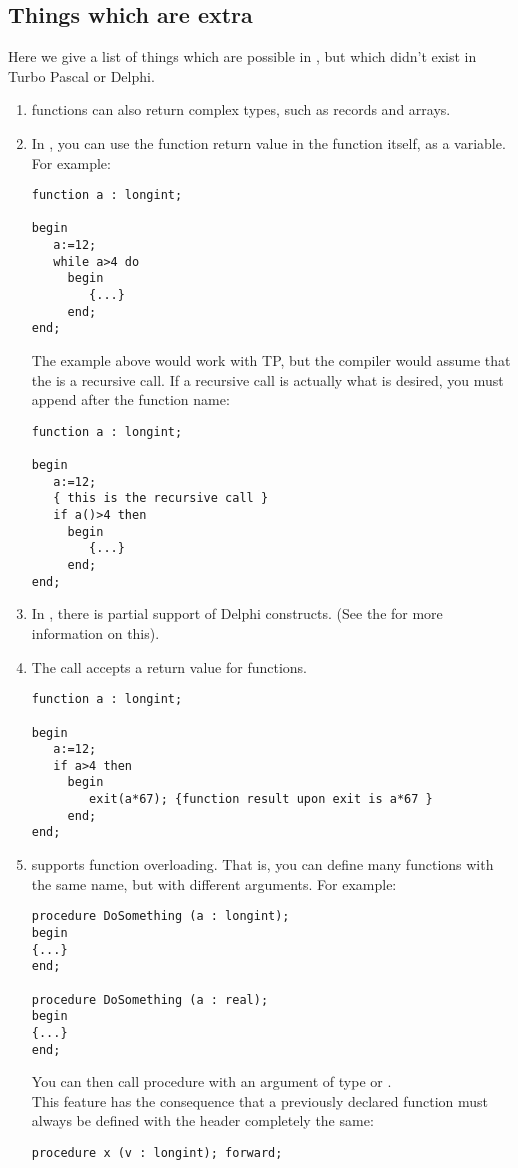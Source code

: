 \subsection{Things which are extra}
Here we give a list of things which are possible in \fpc, but which
didn't exist in Turbo Pascal or Delphi.
\begin{enumerate}
\item \fpc functions can also return complex types, such as records and arrays.
\item In \fpc, you can use the function return value in the function itself, as a
variable. For example:
\begin{verbatim}
function a : longint;

begin
   a:=12;
   while a>4 do
     begin
        {...}
     end;
end;
\end{verbatim}
The example above would work with TP, but the compiler would assume
that the  is a recursive call. If a recursive call is actually what
is desired, you must append \var{()} after the function name:
\begin{verbatim}
function a : longint;

begin
   a:=12;
   { this is the recursive call }
   if a()>4 then
     begin
        {...}
     end;
end;
\end{verbatim}
\item In \fpc, there is partial support of Delphi constructs. (See the \progref for
more information on this).
\item The \fpc {} call accepts a return value for functions.
\begin{verbatim}
function a : longint;

begin
   a:=12;
   if a>4 then
     begin
        exit(a*67); {function result upon exit is a*67 }
     end;
end;
\end{verbatim}
\item \fpc supports function overloading. That is, you can define many
functions with the same name, but with different arguments. For example:
\begin{verbatim}
procedure DoSomething (a : longint);
begin
{...}
end;

procedure DoSomething (a : real);
begin
{...}
end;
\end{verbatim}
You can then call procedure  with an argument of type
 or .\\
This feature has the consequence that a previously declared function must
always be defined with the header completely the same:
\begin{verbatim}
procedure x (v : longint); forward;


\end{verbatim}
\end{enumerate}
